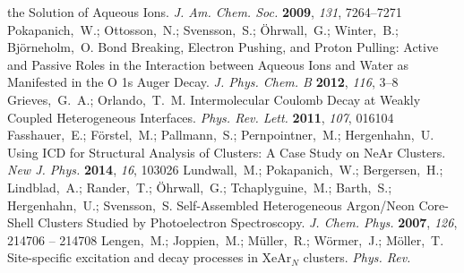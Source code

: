\documentclass[journal=jpccck,manuscript=article]{achemso}
\begin{document}
\begin{mcitethebibliography}{73}
  the Solution of Aqueous Ions. \emph{J. Am. Chem. Soc.} \textbf{2009},
  \emph{131}, 7264--7271\relax
\mciteBstWouldAddEndPuncttrue
\mciteSetBstMidEndSepPunct{\mcitedefaultmidpunct}
{\mcitedefaultendpunct}{\mcitedefaultseppunct}\relax
\EndOfBibitem
{}
Pokapanich,~W.; Ottosson,~N.; Svensson,~S.; \"Ohrwall,~G.; Winter,~B.;
  Bj\"orneholm,~O. Bond Breaking, Electron Pushing, and Proton Pulling: Active
  and Passive Roles in the Interaction between Aqueous Ions and Water as
  Manifested in the O 1s Auger Decay. \emph{J. Phys. Chem. B} \textbf{2012},
  \emph{116}, 3--8\relax
\mciteBstWouldAddEndPuncttrue
\mciteSetBstMidEndSepPunct{\mcitedefaultmidpunct}
{\mcitedefaultendpunct}{\mcitedefaultseppunct}\relax
\EndOfBibitem
{}
Grieves,~G.~A.; Orlando,~T.~M. Intermolecular Coulomb Decay at Weakly Coupled
  Heterogeneous Interfaces. \emph{Phys. Rev. Lett.} \textbf{2011}, \emph{107},
  016104\relax
\mciteBstWouldAddEndPuncttrue
\mciteSetBstMidEndSepPunct{\mcitedefaultmidpunct}
{\mcitedefaultendpunct}{\mcitedefaultseppunct}\relax
\EndOfBibitem
{}
Fasshauer,~E.; F\"orstel,~M.; Pallmann,~S.; Pernpointner,~M.; Hergenhahn,~U.
  Using ICD for Structural Analysis of Clusters: A Case Study on NeAr Clusters.
  \emph{New J. Phys.} \textbf{2014}, \emph{16}, 103026\relax
\mciteBstWouldAddEndPuncttrue
\mciteSetBstMidEndSepPunct{\mcitedefaultmidpunct}
{\mcitedefaultendpunct}{\mcitedefaultseppunct}\relax
\EndOfBibitem
{}
Lundwall,~M.; Pokapanich,~W.; Bergersen,~H.; Lindblad,~A.; Rander,~T.;
  \"Ohrwall,~G.; Tchaplyguine,~M.; Barth,~S.; Hergenhahn,~U.; Svensson,~S.
    Self-Assembled Heterogeneous Argon/Neon Core-Shell Clusters
  Studied by Photoelectron Spectroscopy. \emph{J. Chem. Phys.} \textbf{2007},
  \emph{126}, 214706 -- 214708\relax
\mciteBstWouldAddEndPuncttrue
\mciteSetBstMidEndSepPunct{\mcitedefaultmidpunct}
{\mcitedefaultendpunct}{\mcitedefaultseppunct}\relax
\EndOfBibitem
{}
Lengen,~M.; Joppien,~M.; M\"uller,~R.; W\"ormer,~J.; M\"oller,~T. Site-specific
  excitation and decay processes in XeAr$_{N}$ clusters. \emph{Phys. Rev.
}
\end{mcitethebibliography}
\end{document}
